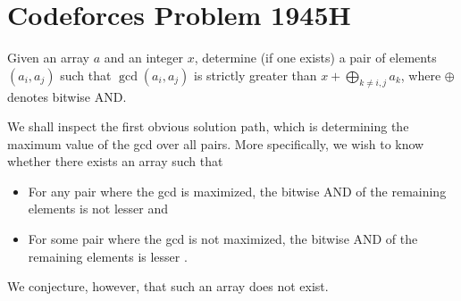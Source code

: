 \documentclass[a4paper, 12pt]{article}
\begin{document}
\section*{Codeforces Problem 1945H}

\begin{chirpbox}
    \begin{problem}
        Given an array \( a \) and an integer \( x \), determine (if one
        exists) a pair of elements \( (a_i, a_j) \) such that \( \gcd{(a_i,
        a_j)} \) is strictly greater than \( x + \bigoplus_{k \ne i, j} a_k \),
        where \( \oplus \) denotes bitwise AND.
    \end{problem}
\end{chirpbox}

\begin{solution}
    We shall inspect the first obvious solution path, which is determining the
    maximum value of the gcd over all pairs. More specifically, we wish to know whether there exists an array such that
    \begin{itemize}
        \item For any pair where the gcd is maximized, the bitwise AND of the remaining elements is not lesser and
        \item For some pair where the gcd is not maximized, the bitwise AND of the remaining elements is lesser
    .\end{itemize}
    We conjecture, however, that such an array does not exist.
\end{solution}
\end{document}
